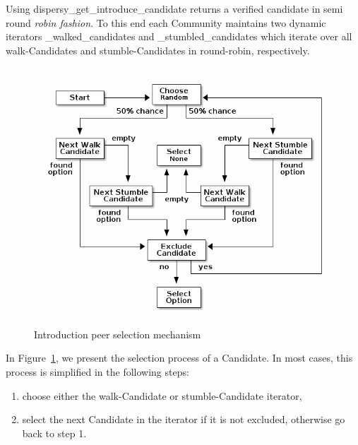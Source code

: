 Using dispersy\_get\_introduce\_candidate returns a verified candidate in
semi round \emph{robin fashion}.  To this end each Community maintains two
dynamic iterators\footnotemark[3]{} \_walked\_candidates and
\_stumbled\_candidates which iterate over all walk-Candidates and
stumble-Candidates in round-robin, respectively.

\begin{figure}{}
\centering
\includegraphics[width=.9\linewidth]{who-to-introduce.png}
\caption{\label{fig:who-to-introduce}Introduction peer selection mechanism}
\end{figure}

In Figure~\ref{fig:who-to-introduce}, we present the selection process
of a Candidate.  In most cases, this process is simplified in the
following steps:
\begin{enumerate}
\item choose either the walk-Candidate or stumble-Candidate iterator,
\item select the next Candidate in the iterator if it is not excluded,
otherwise go back to step 1.
\end{enumerate}

